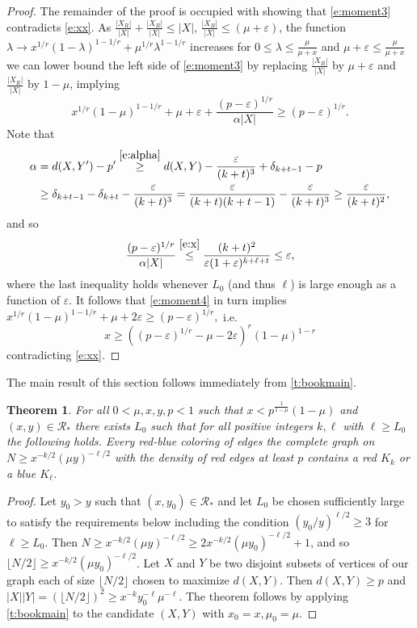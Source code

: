 \documentclass[reqno,final,12pt]{amsart}
\newtheorem{thm}{Theorem}
\newcommand{\eps}{\varepsilon}
\newcommand{\mc}[1]{\mathcal{#1}}
\begin{document}
\begin{proof}
The remainder of the proof is occupied with showing that \eqref{e:moment3} contradicts \eqref{e:xx}.
As $\frac{|X_R|}{|X|}+\frac{|X_B|}{|X|}\leq |X|$, $\frac{|X_B|}{|X|} \leq (\mu+\eps)$, the function $\lambda \to x^{1/r}(1-\lambda)^{1-1/r} + \mu^{1/r}\lambda^{1-1/r} $ increases for $0 \leq \lambda \leq \frac{\mu}{\mu+x}$ and $ \mu+\eps \leq \frac{\mu}{\mu+x}$ we can lower bound the left side of \eqref{e:moment3} by replacing $\frac{|X_B|}{|X|} $ by $\mu+\eps$  and $\frac{|X_R|}{|X|} $ by $1-\mu$, implying
\begin{equation}\label{e:moment4}
x^{1/r}(1-\mu)^{1-1/r}+\mu+ \eps + \frac{(p-\eps)^{1/r}}{\alpha|X|} \geq (p-\eps)^{1/r}. 
\end{equation}
Note that \begin{align*} \alpha &= d(X,Y')-p' \stackrel{\eqref{e:alpha}}{\geq} d(X,Y) -\frac{\eps}{(k+t)^3}+ \delta_{k+t-1} - p \\ &\geq  \delta_{k+t-1} - \delta_{k+t}  -\frac{\eps}{(k+t)^3} =  \frac{\eps}{(k+t)(k+t-1)}-\frac{\eps}{(k+t)^3} \geq \frac{\eps}{(k+t)^2},\end{align*}
and so $$ \frac{(p-\eps)^{1/r}}{\alpha|X|}  \stackrel{\eqref{e:x}}{\leq} \frac{(k+t)^2}{\eps(1+\eps)^{k+\ell+t}} \leq \eps,$$
where the last inequality holds whenever $L_0$ (and thus $\ell$) is large enough as a function of $\eps$.
It follows that \eqref{e:moment4} in turn implies
$x^{1/r}(1-\mu)^{1-1/r}+\mu+ 2\eps  \geq (p-\eps)^{1/r}, $ i.e.
$$ x \geq  ((p-\eps)^{1/r} - \mu- 2\eps)^r(1-\mu)^{1-r} $$
contradicting \eqref{e:xx}.
\end{proof}

The main result of this section follows immediately from \cref{t:bookmain}.

\begin{thm}\label{t:bookCor}
For all $0< \mu,x,y,p <1$ such that $x < p^{\frac{1}{1-\mu}}(1-\mu)$ and $(x,y) \in \mc{R_*}$  there exists $L_0$ such that for all positive integers $k,\ell$ with $\ell \geq L_0$ the following holds. Every red-blue coloring of edges the complete graph on $N \geq x^{-k/2}(\mu y)^{-\ell/2}$ with the density of red edges  at least $p$ contains a red $K_k$ or a blue $K_{\ell}$. 
\end{thm}
\begin{proof}
Let $y_0 > y$ such that  $(x,y_0) \in \mc{R_*}$  and let $L_0$ be chosen sufficiently large to satisfy the requirements below including the condition $(y_0/y)^{\ell/2} \geq 3$ for $\ell\geq L_0$. Then $N  \geq x^{-k/2}(\mu y)^{-\ell/2} \geq 2x^{-k/2}(\mu y_0)^{-\ell/2} + 1$, and so $\lfloor N/2 \rfloor \geq x^{-k/2}(\mu y_0)^{-\ell/2}$. Let $X$ and $Y$ be two disjoint subsets of vertices of our graph each of size $\lfloor N/2 \rfloor$ chosen to maximize $d(X,Y)$. Then $d(X,Y) \geq p$ and $|X||Y| = (\lfloor N/2 \rfloor)^2 \geq x^{-k}y_0^{-\ell}\mu^{-\ell}$. The theorem follows by applying \cref{t:bookmain} to the candidate $(X,Y)$ with $x_0=x,\mu_0=\mu$.   
\end{proof}
\end{document}
